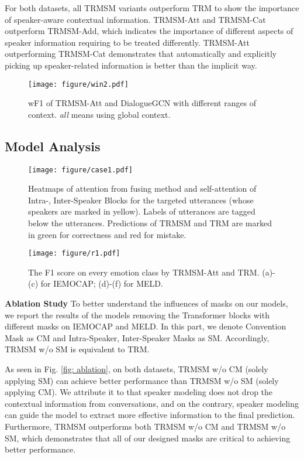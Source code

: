 \documentclass[letterpaper]{article} \usepackage{aaai21}  \usepackage{times}  \usepackage{helvet} \usepackage{courier}  \usepackage[hyphens]{url}  \usepackage{graphicx} \urlstyle{rm} \def\UrlFont{\rm}  \usepackage{natbib}  \usepackage{caption} \usepackage{multirow}
\begin{document}
For both datasets, all TRMSM variants outperform TRM to show the importance of speaker-aware contextual information. TRMSM-Att and TRMSM-Cat outperform TRMSM-Add, which indicates the importance of different aspects of speaker information requiring to be treated differently. TRMSM-Att outperforming TRMSM-Cat demonstrates that automatically and explicitly picking up speaker-related information is better than the implicit way. 

\begin{figure}
    \centering
    \texttt{[image: figure/win2.pdf]}
    \caption{wF1 of TRMSM-Att and DialogueGCN with different ranges of context. \textit{all} means using global context. }
    \label{fig: win}
\end{figure}

\subsection{Model Analysis}

\begin{figure*}
    \centering
    \texttt{[image: figure/case1.pdf]}
    \caption{Heatmaps of attention from fusing method and self-attention of Intra-, Inter-Speaker Blocks for the targeted utterances (whose speakers are marked in yellow). Labels of utterances are tagged below the utterances. Predictions of TRMSM and TRM are marked in green for correctness and red for mistake. }
    \label{fig: case}
\end{figure*}

\begin{figure}
    \centering
    \texttt{[image: figure/r1.pdf]}
    \caption{The F1 score on every emotion class by TRMSM-Att and TRM. (a)-(c) for IEMOCAP; (d)-(f) for MELD.}
    \label{fig: layer}
\end{figure}

\quad \textbf{Ablation Study} \quad To better understand the influences of masks on our models, we report the results of the models removing the Transformer blocks with different masks on IEMOCAP and MELD. In this part, we denote Convention Mask as CM and Intra-Speaker, Inter-Speaker Masks as SM. Accordingly, TRMSM w/o SM is equivalent to TRM. 

As seen in Fig. \ref{fig: ablation}, on both datasets, TRMSM w/o CM (solely applying SM) can achieve better performance than TRMSM w/o SM (solely applying CM). We attribute it to that speaker modeling does not drop the contextual information from conversations, and on the contrary, speaker modeling can guide the model to extract more effective information to the final prediction. Furthermore, TRMSM outperforms both TRMSM w/o CM and TRMSM w/o SM, which demonstrates that all of our designed masks are critical to achieving better performance. 
\end{document}
